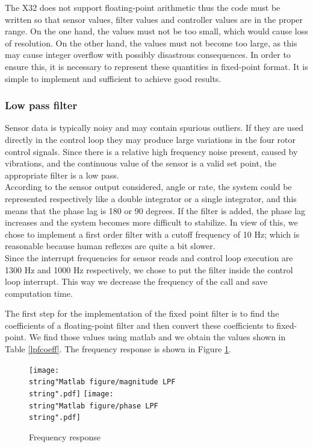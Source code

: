 \documentclass[11pt]{article}
\begin{document}
The X32 does not support floating-point arithmetic thus the code must
be written so that sensor values, filter values and controller values
are in the proper range. On the one hand, the values must not be
too small, which would cause loss of resolution. On the other hand,
the values must not become too large, as this may cause integer overflow
with possibly disastrous consequences. In order to ensure this, it
is necessary to represent these quantities in fixed-point format. It is
simple to implement and sufficient to achieve good results.


\subsubsection{Low pass filter}

Sensor data is typically noisy and may contain spurious outliers.
If they are used directly in the control loop they may produce large
variations in the four rotor control signals. Since there is a relative
high frequency noise present, caused by vibrations, and the continuous value
of the sensor is a valid set point, the appropriate filter is a low pass.
\\
According to the sensor output considered, angle or rate, the system
could be represented respectively like a double integrator or a single
integrator, and this means that the phase lag is 180 or 90 degrees.
If the filter is added, the phase lag increases and the system becomes
more difficult to stabilize. In view of this, we chose to implement
a first order filter with a cutoff frequency of 10 Hz; which is reasonable
because human reflexes are quite a bit slower.\\
Since the interrupt frequencies for sensor reads and control loop execution are
1300 Hz and 1000 Hz respectively, we chose to
put the filter inside the control loop interrupt. This way we decrease the
frequency of the call and save computation time.

The first step for the implementation of the fixed point filter is
to find the coefficients of a floating-point filter and then convert
these coefficients to fixed-point. We find those values using matlab
and we obtain the values shown in Table \ref{lpfcoeff}. The frequency response is shown in Figure \ref{freqresp}.

%
\begin{figure}[h]
\centering
\texttt{[image: \\string"Matlab figure/magnitude LPF\\string".pdf]} \quad
\texttt{[image: \\string"Matlab figure/phase LPF\\string".pdf]}
\caption{Frequency response}
\label{freqresp}

\end{figure}
\end{document}
